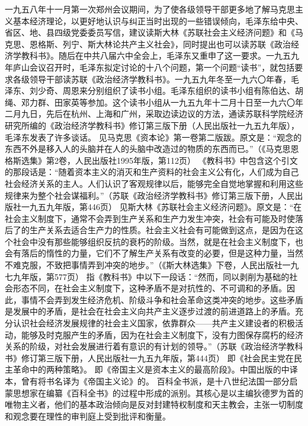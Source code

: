 \begin{maonote}
一九五八年十一月第一次郑州会议期间，为了使各级领导干部更多地了解马克思主义基本经济理论，以更好地认识与纠正当时出现的一些错误倾向，毛泽东给中央、省区、地、县四级党委委员写信，建议读斯大林《苏联社会主义经济问题》和《马克思、恩格斯、列宁、斯大林论共产主义社会》，同时提出也可以读苏联《政治经济学教科书》。随后在中共八届六中全会上，毛泽东又重申了这一要求。一九五九年庐山会议召开时，毛泽东拟定讨论的十八个问题，第一个问题“读书”，就包括要求各级领导干部读苏联《政治经济学教科书》。一九五九年冬至一九六〇年春，毛泽东、刘少奇、周恩来分别组织了读书小组。毛泽东组织的读书小组有陈伯达、胡绳、邓力群、田家英等参加。这个读书小组从一九五九年十二月十日至一九六〇年二月九日，先后在杭州、上海和广州，采取边读边议的方法，通读苏联科学院经济研究所编的《政治经济学教科书》修订第三版下册（人民出版社一九五九年版），毛泽东发表了许多谈话。
见马克思《资本论》第一卷第二版跋。原文是：“观念的东西不外是移入人的头脑并在人的头脑中改造过的物质的东西而已。”（《马克思恩格斯选集》第2卷，人民出版社1995年版，第112页）
《教科书》中包含这个引文的那段话是：“随着资本主义的消灭和生产资料的社会主义公有化，人们成为自己社会经济关系的主人。人们认识了客观规律以后，能够完全自觉地掌握和利用这些规律来为整个社会谋福利。”（苏联《政治经济学教科书》修订第三版下册，人民出版社一九五九年版，第446页）
见斯大林《苏联社会主义经济问题》。原文是：“在社会主义制度下，通常不会弄到生产关系和生产力发生冲突，社会有可能及时使落后了的生产关系去适合生产力的性质。社会主义社会有可能做到这点，是因为在这个社会中没有那些能够组织反抗的衰朽的阶级。当然，就是在社会主义制度下，也会有落后的惰性的力量，它们不了解生产关系有改变的必要，但是这种力量，当然不难克服，不致把事情弄到冲突的地步。”（《斯大林选集》下卷，人民出版社一九七九年版，第577页）
指《教科书》中以下一段话：“然而，同以剥削为基础的社会形态不同，在社会主义制度下，这种矛盾不是对抗性的、不可调和的矛盾。因此，事情不会弄到发生经济危机、阶级斗争和社会革命这类冲突的地步。这些矛盾是发展中的矛盾，是社会在社会主义向共产主义逐步过渡的前进道路上的矛盾。充分认识社会经济发展规律的社会主义国家，依靠群众——共产主义建设者的积极活动，能够及时克服产生的矛盾，因为在社会主义制度下，没有力图保存腐朽的经济关系的阶级，对社会发展进行着有意识的有计划的领导。”（苏联《政治经济学教科书》修订第三版下册，人民出版社一九五九年版，第444页）
即《社会民主党在民主革命中的两种策略》。
即《帝国主义是资本主义的最高阶段》。中国出版的中译本，曾有将书名译为《帝国主义论》的。
百科全书派，是十八世纪法国一部分启蒙思想家在编纂《百科全书》的过程中形成的派别。其核心是以主编狄德罗为首的唯物主义者，他们的基本政治倾向是反对封建特权制度和天主教会，主张一切制度和观念要在理性的审判庭上受到批评和衡量。

\end{maonote}
